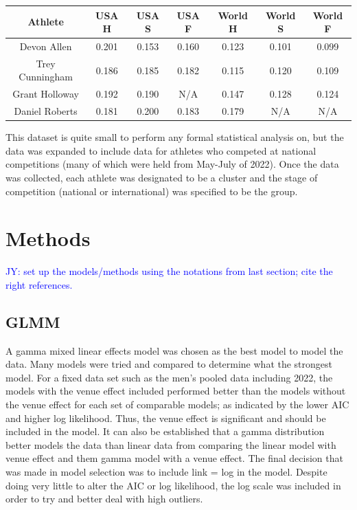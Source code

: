 \documentclass[12pt, letterpaper, titlepage]{article}
\newcommand{\jy}[1]{\textcolor{blue}{JY: #1}}
\begin{document}
\begin{center}
  \begin{tabular}{|c c c c c c c|} 
   \toprule
   Athlete & USA H & USA S & USA F & World H & World S & World F \\ [0.5ex] 
   \midrule
   Devon Allen & 0.201 & 0.153 & 0.160 & 0.123 & 0.101 & 0.099 \\ 
   Trey Cunningham & 0.186 & 0.185 & 0.182 & 0.115 & 0.120 & 0.109 \\
   Grant Holloway & 0.192 & 0.190 & N/A & 0.147 & 0.128 & 0.124 \\
   Daniel Roberts & 0.181 & 0.200 & 0.183 & 0.179 & N/A & N/A \\ [0.5ex]
   \bottomrule
  \end{tabular}
  \end{center}

This dataset is quite small to perform any formal statistical analysis on, but
the data was expanded to include data for athletes who competed at national
competitions (many of which were held from May-July of 2022).  Once the data
was collected, each athlete was designated to be a cluster and the stage of
competition (national or international) was specified to be the group. 

\section{Methods} \label{sec:Methods}

\jy{set up the models/methods using the notations from last section; cite the
  right references.}

\subsection{GLMM}
A gamma mixed linear effects model was chosen as the best model to model the data.
Many models were tried and compared to determine what the strongest model.  For
a fixed data set such as the men's pooled data including 2022, the models with
the venue effect included performed better than the models without the venue
effect for each set of comparable models; as indicated by the lower AIC and
higher log likelihood.  Thus, the venue effect is significant and should be
included in the model.  It can also be established that a gamma distribution
better models the data than linear data from comparing the linear model with
venue effect and them gamma model with a venue effect.  The final decision that
was made in model selection was to include link = log in the model.  Despite
doing very little to alter the AIC or log likelihood, the log scale was included
in order to try and better deal with high outliers. %
\end{document}
